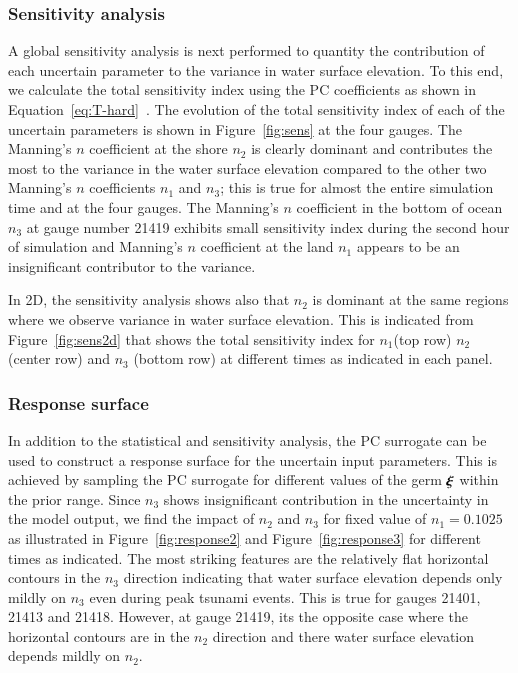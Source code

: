 \subsubsection{Sensitivity analysis}
A global sensitivity analysis is next performed to quantity the contribution of each
uncertain parameter to the variance in water surface elevation. To this end, we calculate 
the total sensitivity index using the PC coefficients as shown in Equation~\eqref{eq:T-hard}~\citep{Alexanderian2012,Sudret,Crestaux}. The evolution of the total sensitivity index
of each of the uncertain parameters is shown in Figure~\ref{fig:sens} at the four gauges. 
The Manning's $n$ coefficient at the shore $n_2$ is clearly dominant and contributes
the most to the variance in the water surface elevation compared to the other two 
Manning's $n$ coefficients $n_1$ and $n_3$; this is true for almost the entire simulation time
and at the four gauges. The Manning's $n$ coefficient
in the bottom of ocean $n_{3}$ at gauge number 21419 exhibits small sensitivity index 
during the second hour of simulation and Manning's $n$ coefficient
at the land $n_1$ appears to be an insignificant contributor
to the variance.

In 2D, the sensitivity analysis shows also that $n_2$ is dominant
at the same regions where we observe variance in water surface elevation. This is
indicated from Figure~\ref{fig:sens2d} that shows the total sensitivity index
for $n_1$(top row) $n_2$(center row) and $n_3$ (bottom row)
at different times as indicated in each panel.

\subsubsection{Response surface}
In addition to the statistical and sensitivity analysis, the PC surrogate 
can be used to construct a response surface for the uncertain input parameters.
This is achieved by sampling the PC surrogate for different values of the germ $\xxi$ within the prior
range. Since $n_3$ shows insignificant contribution in the 
uncertainty in the model output, we find the impact of $n_2$ and $n_3$ for 
fixed value of $n_1=0.1025$ as illustrated in Figure~\ref{fig:response2}
and Figure~\ref{fig:response3} for different times as indicated. The most striking features are the relatively flat
horizontal contours in the $n_3$ direction indicating that water surface elevation depends
only mildly on $n_3$ even during peak tsunami events. This is true for gauges 21401, 21413 and 21418. However,
at gauge 21419, its the opposite case where the horizontal contours are in the $n_2 $ direction
and there water surface elevation depends mildly on $n_2$.
